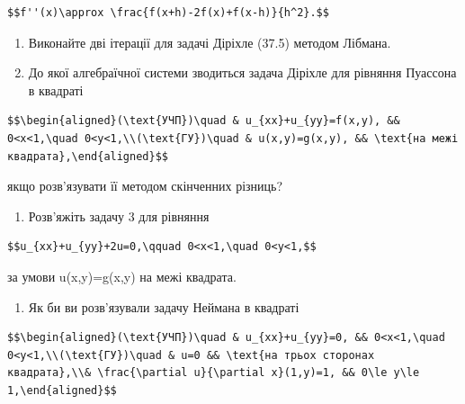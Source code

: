 \documentclass[
  ukrainian,
]{article}
\providecommand{\tightlist}{%
  \setlength{\itemsep}{0pt}\setlength{\parskip}{0pt}}
\begin{document}
\begin{verbatim}
$$f''(x)\approx \frac{f(x+h)-2f(x)+f(x-h)}{h^2}.$$
\end{verbatim}

\begin{enumerate}
\def\labelenumi{\arabic{enumi}.}
\setcounter{enumi}{1}
\item
  Виконайте дві ітерації для задачі Діріхле (37.5) методом Лібмана.
\item
  До якої алгебраїчної системи зводиться задача Діріхле для рівняння
  Пуассона в квадраті
\end{enumerate}

\begin{verbatim}
$$\begin{aligned}(\text{УЧП})\quad & u_{xx}+u_{yy}=f(x,y), && 0<x<1,\quad 0<y<1,\\(\text{ГУ})\quad & u(x,y)=g(x,y), && \text{на межі квадрата},\end{aligned}$$
\end{verbatim}

якщо розв'язувати її методом скінченних різниць?

\begin{enumerate}
\def\labelenumi{\arabic{enumi}.}
\setcounter{enumi}{3}
\tightlist
\item
  Розв'яжіть задачу 3 для рівняння
\end{enumerate}

\begin{verbatim}
$$u_{xx}+u_{yy}+2u=0,\qquad 0<x<1,\quad 0<y<1,$$
\end{verbatim}

за умови u(x,y)=g(x,y) на межі квадрата.

\begin{enumerate}
\def\labelenumi{\arabic{enumi}.}
\setcounter{enumi}{4}
\tightlist
\item
  Як би ви розв'язували задачу Неймана в квадраті
\end{enumerate}

\begin{verbatim}
$$\begin{aligned}(\text{УЧП})\quad & u_{xx}+u_{yy}=0, && 0<x<1,\quad 0<y<1,\\(\text{ГУ})\quad & u=0 && \text{на трьох сторонах квадрата},\\& \frac{\partial u}{\partial x}(1,y)=1, && 0\le y\le 1,\end{aligned}$$
\end{verbatim}
\end{document}

